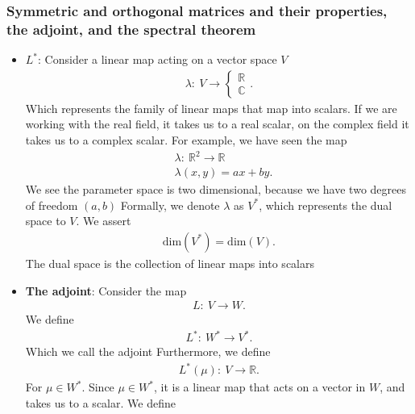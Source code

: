\documentclass{report}
\begin{document}
    \subsubsection{Symmetric and orthogonal matrices and their properties, the adjoint, and the spectral theorem}
    \begin{itemize}
         \item \textbf{$L^{*}$}: Consider a linear map acting on a vector space $V$
            \begin{align*}
                \lambda:\ V \to \begin{cases} \mathbb{R} \\ \mathbb{C} \end{cases}
            .\end{align*}
            Which represents the family of linear maps that map into scalars. If we are working with the real field, it takes us to a real scalar, on the complex field it takes us to a complex scalar. For example, we have seen the map
            \begin{align*}
                &\lambda:\ \mathbb{R}^{2} \to \mathbb{R} \\
                &\lambda(x,y) = ax + by
            .\end{align*}
            We see the parameter space is two dimensional, because we have two degrees of freedom $(a,b)$
            \bigbreak \noindent 
            Formally, we denote $\lambda$ as $V^{*}$, which represents the dual space to $V$. We assert
            \begin{align*}
                \text{dim}(V^{*}) = \text{dim}(V)
            .\end{align*}
            The dual space is the collection of linear maps into scalars
        \item \textbf{The adjoint}: Consider the map
            \begin{align*}
               L:\ V \to W 
            .\end{align*}
            We define 
            \begin{align*}
                L^{*}:\ W^{*} \to V^{*}
            .\end{align*}
            Which we call the adjoint
            \bigbreak \noindent 
            Furthermore, we define
            \begin{align*}
                L^{*}(\mu):\ V \to \mathbb{R}
            .\end{align*}
            For $\mu \in W^{*}$. Since $\mu \in W^{*}$, it is a linear map that acts on a vector in $W$, and takes us to a scalar. We define

\end{itemize}
\end{document}
